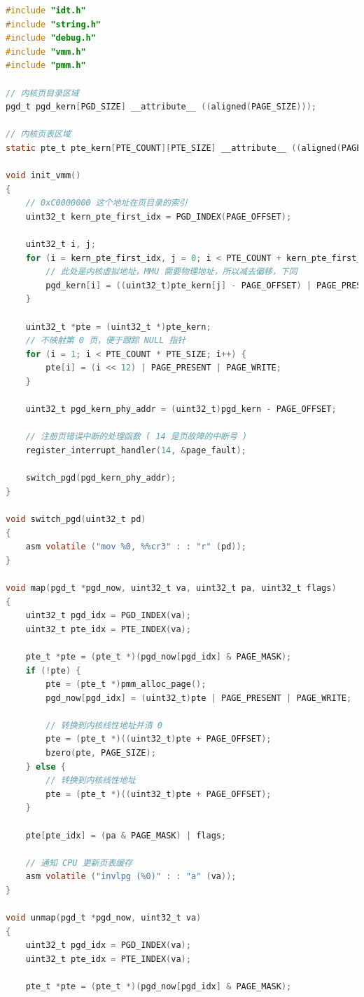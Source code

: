 \begin{lstlisting}[language = C, caption = mm/vmm.c]
#include "idt.h"
#include "string.h"
#include "debug.h"
#include "vmm.h"
#include "pmm.h"

// 内核页目录区域
pgd_t pgd_kern[PGD_SIZE] __attribute__ ((aligned(PAGE_SIZE)));

// 内核页表区域
static pte_t pte_kern[PTE_COUNT][PTE_SIZE] __attribute__ ((aligned(PAGE_SIZE)));

void init_vmm()
{
	// 0xC0000000 这个地址在页目录的索引
	uint32_t kern_pte_first_idx = PGD_INDEX(PAGE_OFFSET);
	
	uint32_t i, j;
	for (i = kern_pte_first_idx, j = 0; i < PTE_COUNT + kern_pte_first_idx; i++, j++) {
		// 此处是内核虚拟地址，MMU 需要物理地址，所以减去偏移，下同
		pgd_kern[i] = ((uint32_t)pte_kern[j] - PAGE_OFFSET) | PAGE_PRESENT | PAGE_WRITE;
	}

	uint32_t *pte = (uint32_t *)pte_kern;
	// 不映射第 0 页，便于跟踪 NULL 指针
	for (i = 1; i < PTE_COUNT * PTE_SIZE; i++) {
		pte[i] = (i << 12) | PAGE_PRESENT | PAGE_WRITE;
	}

	uint32_t pgd_kern_phy_addr = (uint32_t)pgd_kern - PAGE_OFFSET;

	// 注册页错误中断的处理函数 ( 14 是页故障的中断号 )
	register_interrupt_handler(14, &page_fault);

	switch_pgd(pgd_kern_phy_addr);
}

void switch_pgd(uint32_t pd)
{
	asm volatile ("mov %0, %%cr3" : : "r" (pd));
}

void map(pgd_t *pgd_now, uint32_t va, uint32_t pa, uint32_t flags)
{ 	
	uint32_t pgd_idx = PGD_INDEX(va);
	uint32_t pte_idx = PTE_INDEX(va); 
	
	pte_t *pte = (pte_t *)(pgd_now[pgd_idx] & PAGE_MASK);
	if (!pte) {
		pte = (pte_t *)pmm_alloc_page();
		pgd_now[pgd_idx] = (uint32_t)pte | PAGE_PRESENT | PAGE_WRITE;

		// 转换到内核线性地址并清 0
		pte = (pte_t *)((uint32_t)pte + PAGE_OFFSET);
		bzero(pte, PAGE_SIZE);
	} else {
		// 转换到内核线性地址
		pte = (pte_t *)((uint32_t)pte + PAGE_OFFSET);
	}

	pte[pte_idx] = (pa & PAGE_MASK) | flags;

	// 通知 CPU 更新页表缓存
	asm volatile ("invlpg (%0)" : : "a" (va));
}

void unmap(pgd_t *pgd_now, uint32_t va)
{
	uint32_t pgd_idx = PGD_INDEX(va);
	uint32_t pte_idx = PTE_INDEX(va);

	pte_t *pte = (pte_t *)(pgd_now[pgd_idx] & PAGE_MASK);


\end{lstlisting}
